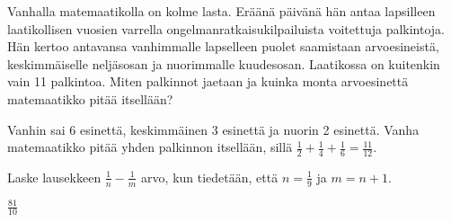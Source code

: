 \begin{tehtavasivu}
\begin{tehtava}
	Vanhalla matemaatikolla on kolme lasta. Eräänä päivänä hän antaa lapsilleen laatikollisen vuosien varrella 						
	ongelmanratkaisukilpailuista voitettuja palkintoja. Hän kertoo antavansa vanhimmalle lapselleen puolet
	saamistaan arvoesineistä, keskimmäiselle neljäsosan ja nuorimmalle kuudesosan. Laatikossa on kuitenkin vain 11 palkintoa. Miten 	
	palkinnot jaetaan ja kuinka monta arvoesinettä matemaatikko pitää itsellään?
	\begin{vastaus}
		Vanhin sai 6 esinettä, keskimmäinen 3 esinettä ja nuorin 2 esinettä. Vanha
		matemaatikko pitää yhden palkinnon itsellään, sillä $\frac{1}{2} + \frac{1}{4}
		+ \frac{1}{6} = \frac{11}{12}$.
	\end{vastaus}
\end{tehtava}


\begin{tehtava}
	Laske lausekkeen $\frac{1}{n}-\frac{1}{m}$ arvo, kun tiedetään, että $n = \frac{1}{9}$ ja $m=n+1$.
	\begin{vastaus}
		$\frac{81}{10}$
	\end{vastaus}
\end{tehtava}


\end{tehtavasivu}
